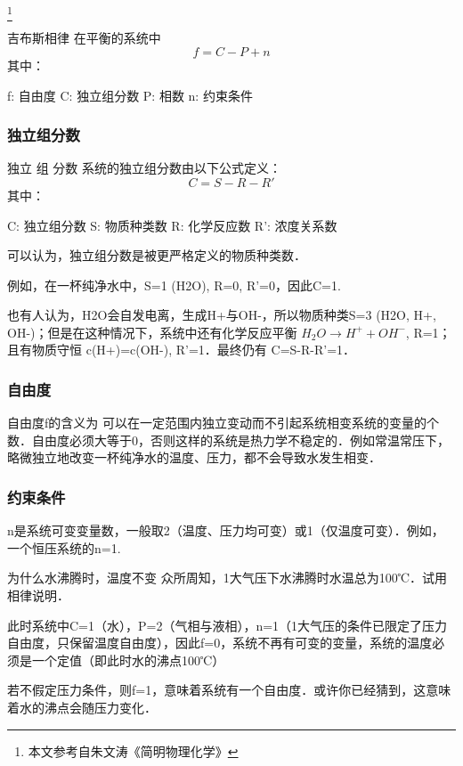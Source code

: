 
\footnote{本文参考自朱文涛《简明物理化学》}

\begin{theorem}{吉布斯相律}
在平衡的系统中
\begin{equation}
f=C-P+n
\end{equation}
其中：

f: 自由度
C: 独立组分数
P: 相数
n: 约束条件
\end{theorem}
\subsubsection{独立组分数}
\begin{definition}{独立 组 分数}
系统的独立组分数由以下公式定义：
\begin{equation}
C=S-R-R'
\end{equation}
其中：

C: 独立组分数
S: 物质种类数
R: 化学反应数
R': 浓度关系数
\end{definition}

可以认为，独立组分数是被更严格定义的物质种类数．

例如，在一杯纯净水中，S=1 (H2O), R=0, R'=0，因此C=1.

也有人认为，H2O会自发电离，生成H+与OH-，所以物质种类S=3 (H2O, H+, OH-)；但是在这种情况下，系统中还有化学反应平衡 $H_2O\rightarrow H^++OH^-$, R=1；且有物质守恒 c(H+)=c(OH-), R'=1．最终仍有 C=S-R-R'=1．

\subsubsection{自由度}
自由度f的含义为 可以在一定范围内独立变动而不引起系统相变系统的变量的个数．自由度必须大等于0，否则这样的系统是热力学不稳定的．例如常温常压下，略微独立地改变一杯纯净水的温度、压力，都不会导致水发生相变．

\subsubsection{约束条件}
n是系统可变变量数，一般取2（温度、压力均可变）或1（仅温度可变）．例如，一个恒压系统的n=1.

\begin{example}{为什么水沸腾时，温度不变}
众所周知，1大气压下水沸腾时水温总为100℃．试用相律说明．

此时系统中C=1（水），P=2（气相与液相），n=1（1大气压的条件已限定了压力自由度，只保留温度自由度），因此f=0，系统不再有可变的变量，系统的温度必须是一个定值（即此时水的沸点100℃）

若不假定压力条件，则f=1，意味着系统有一个自由度．或许你已经猜到，这意味着水的沸点会随压力变化．
\end{example}

